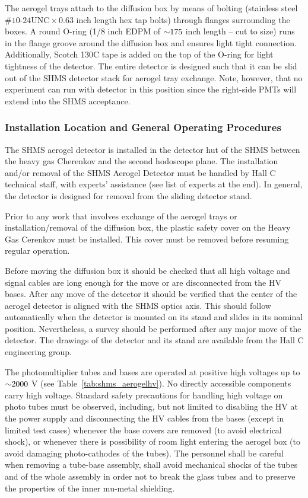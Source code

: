 The aerogel trays attach to the diffusion box by means of bolting
(stainless steel $\textrm{\#10-24UNC}\times 0.63$ inch length hex tap bolts) through
flanges surrounding the boxes. A round O-ring (1/8 inch EDPM of $\mathord{\sim} 175$
inch
length – cut to size) runs in the flange groove around the diffusion
box and ensures light tight connection. Additionally, Scotch 130C tape
is added on the top of the O-ring for light tightness of the
detector. The entire detector is designed such that it can be slid out
of the SHMS detector stack for aerogel tray exchange. Note, however,
that no experiment can run with detector in this position since the
right-side PMTs will extend into the SHMS acceptance.

\subsubsection{Installation Location and General Operating Procedures}
The SHMS aerogel detector is installed in the detector hut of the SHMS
between the heavy gas Cherenkov and the second hodoscope plane. The
installation and/or removal of the SHMS Aerogel Detector must be
handled by Hall C technical staff, with experts’ assistance (see list
of experts at the end). In general, the detector is designed for
removal from the sliding detector stand.

Prior to any work that involves exchange of the aerogel trays or
installation/removal of the diffusion box, the plastic safety cover on
the Heavy Gas Cerenkov must be installed. This cover must be removed
before resuming regular operation.

Before moving the diffusion box it should be checked that all high
voltage and signal cables are long enough for the move or are
disconnected from the HV bases. After any move of the detector it
should be verified that the center of the aerogel detector is aligned
with the SHMS optics axis. This should follow automatically when the
detector is mounted on its stand and slides in its nominal
position. Nevertheless, a survey should be performed after any major
move of the detector. The drawings of the detector and its stand are
available from the Hall C engineering group.

The photomultiplier tubes and bases are operated at positive high
voltages up to $\mathord{\sim} 2000$ V (see Table~\ref{tab:shms_aerogelhv}). No directly accessible
components carry high voltage. Standard safety precautions for
handling high voltage on photo tubes must be observed, including, but
not limited to disabling the HV at the power supply and disconnecting
the HV cables from the bases (except in limited test cases) whenever
the base covers are removed (to avoid electrical shock), or whenever
there is possibility of room light entering the aerogel box (to avoid
damaging photo-cathodes of the tubes). The personnel shall be careful
when removing a tube-base assembly, shall avoid mechanical shocks of
the tubes and of the whole assembly in order not to break the glass
tubes and to preserve the properties of the inner mu-metal shielding.

